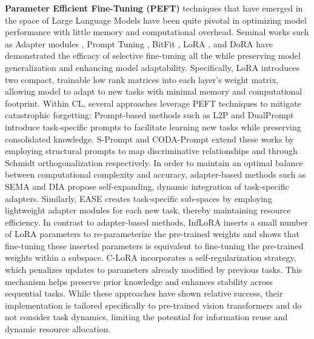 \documentclass[10pt]{article} %
\begin{document}
\textbf{Parameter Efficient Fine-Tuning (PEFT)} techniques that have emerged in the space of Large Language Models have been quite pivotal in optimizing model performance with little memory and computational overhead. Seminal works such as Adapter modules \citep{houlsby2019parameter},  Prompt Tuning \citep{brown2020language}, BitFit \citep{zaken2021bitfit}, LoRA \citep{hu2021lora}, and DoRA \citep{liu2024dora} have demonstrated the efficacy of selective fine-tuning all the while preserving model generalization and enhancing model adaptability. Specifically, LoRA introduces two compact, trainable low rank matrices into each layer's weight matrix, allowing model to adapt to new tasks with minimal memory and computational footprint. Within CL, several approaches leverage PEFT techniques to mitigate catastrophic forgetting: Prompt-based methods such as L2P \citep{wang2022learning} and DualPrompt \citep{wang2022dualprompt} introduce task-specific prompts to facilitate learning new tasks while preserving consolidated knowledge. S-Prompt \citep{wang2022s} and CODA-Prompt \citep{smith2023coda}  extend these works by employing structural prompts to map discriminative relationships and through Schmidt orthogonalization respectively. In order to maintain an optimal balance between computational complexity and accuracy, adapter-based methods such as SEMA \citep{SEMA} and DIA \citep{DIA} propose self-expanding, dynamic integration of task-specific adapters. Similarly, EASE \citep{zhou2024expandable} creates task-specific sub-spaces by employing lightweight adapter modules for each new task, thereby maintaining resource efficiency.  
In contrast to adapter-based methods, InfLoRA \citep{liang2024inflora} inserts a small number of LoRA parameters to re-parameterize the pre-trained weights and shows that fine-tuning these inserted parameters is equivalent to fine-tuning the pre-trained weights within a subspace. C-LoRA \citep{DBLP:journals/corr/abs-2304-06027} incorporates a self-regularization strategy, which penalizes updates to parameters already modified by previous tasks. This mechanism helps preserve prior knowledge and enhances stability across sequential tasks. While these approaches have shown relative success, their implementation is tailored specifically to pre-trained vision transformers and do not consider task dynamics, limiting the potential for information reuse and dynamic resource allocation.
\end{document}
